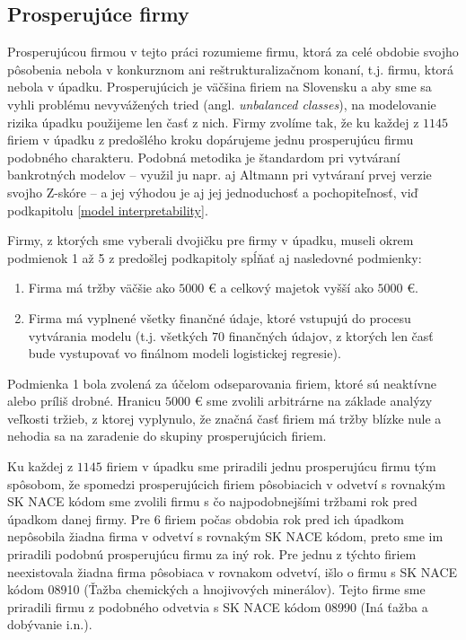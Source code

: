\subsection{Prosperujúce firmy}

Prosperujúcou firmou v tejto práci rozumieme firmu, ktorá za celé obdobie svojho pôsobenia nebola v konkurznom ani reštrukturalizačnom konaní, t.j. firmu, ktorá nebola v úpadku.
Prosperujúcich je väčšina firiem na Slovensku a aby sme sa vyhli problému nevyvážených tried (angl. \emph{unbalanced classes}),
na modelovanie rizika úpadku použijeme len časť z nich.
Firmy zvolíme tak, že ku každej z \(1145\) firiem v úpadku z predošlého kroku dopárujeme jednu prosperujúcu firmu podobného charakteru.
Podobná metodika je štandardom pri vytváraní bankrotných modelov – využil ju napr. aj Altmann pri vytváraní prvej verzie svojho Z-skóre – a jej výhodou je aj jej jednoduchosť a pochopiteľnosť, viď podkapitolu \ref{model interpretability}.

Firmy, z ktorých sme vyberali dvojičku pre firmy v úpadku, museli okrem podmienok 1 až 5 z predošlej podkapitoly spĺňať aj nasledovné podmienky:

\begin{enumerate}
    \item Firma má tržby väčšie ako \(5000\) € a celkový majetok vyšší ako \(5000\) €.
    \item Firma má vyplnené všetky finančné údaje, ktoré vstupujú do procesu vytvárania modelu (t.j. všetkých \(70\) finančných údajov, z ktorých len časť bude vystupovať vo finálnom modeli logistickej regresie).
\end{enumerate}

Podmienka 1 bola zvolená za účelom odseparovania firiem, ktoré sú neaktívne alebo príliš drobné.
Hranicu \(5000\) € sme zvolili arbitrárne na základe analýzy veľkosti tržieb, z ktorej vyplynulo, že značná časť firiem má tržby blízke nule a nehodia sa na zaradenie do skupiny prosperujúcich firiem.

Ku každej z \(1145\) firiem v úpadku sme priradili jednu prosperujúcu firmu tým spôsobom,
že spomedzi prosperujúcich firiem pôsobiacich v odvetví s rovnakým SK NACE kódom sme zvolili firmu s čo najpodobnejšími tržbami rok pred úpadkom danej firmy.
Pre \(6\) firiem počas obdobia rok pred ich úpadkom nepôsobila žiadna firma v odvetví s rovnakým SK NACE kódom, preto sme im priradili podobnú prosperujúcu firmu za iný rok.
Pre jednu z týchto firiem neexistovala žiadna firma pôsobiaca v rovnakom odvetví, išlo o firmu s SK NACE kódom 08910 (Ťažba chemických a hnojivových minerálov).
Tejto firme sme priradili firmu z podobného odvetvia s SK NACE kódom 08990 (Iná ťažba a dobývanie i.n.).

